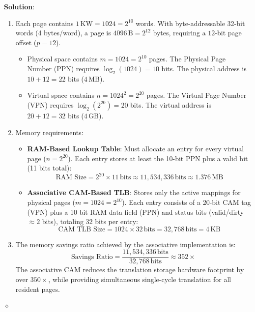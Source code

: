 \begin{problem}
\textbf{Solution}:
\begin{enumerate}
    \item Each page contains $1\,\text{KW} = 1024 = 2^{10}$ words. With byte-addressable 32-bit words (4 bytes/word), a page is $4096\,\text{B} = 2^{12}$ bytes, requiring a $12$-bit page offset ($p = 12$).
    \begin{itemize}
        \item Physical space contains $m = 1024 = 2^{10}$ pages. The Physical Page Number (PPN) requires $\log_2(1024) = 10$ bits. The physical address is $10 + 12 = 22$ bits ($4\,\text{MB}$).
        \item Virtual space contains $n = 1024^2 = 2^{20}$ pages. The Virtual Page Number (VPN) requires $\log_2(2^{20}) = 20$ bits. The virtual address is $20 + 12 = 32$ bits ($4\,\text{GB}$).
    \end{itemize}
    \item Memory requirements:
    \begin{itemize}
        \item \textbf{RAM-Based Lookup Table}: Must allocate an entry for every virtual page ($n = 2^{20}$). Each entry stores at least the 10-bit PPN plus a valid bit (11 bits total):
        \[
        \text{RAM Size} = 2^{20} \times 11\,\text{bits} \approx 11{,}534{,}336\,\text{bits} \approx 1.376\,\text{MB}
        \]
        \item \textbf{Associative CAM-Based TLB}: Stores only the active mappings for physical pages ($m = 1024 = 2^{10}$). Each entry consists of a 20-bit CAM tag (VPN) plus a 10-bit RAM data field (PPN) and status bits (valid/dirty $\approx 2$ bits), totaling 32 bits per entry:
        \[
        \text{CAM TLB Size} = 1024 \times 32\,\text{bits} = 32{,}768\,\text{bits} = 4\,\text{KB}
        \]
    \end{itemize}
    \item The memory savings ratio achieved by the associative implementation is:
    \[
    \text{Savings Ratio} = \frac{11{,}534{,}336\,\text{bits}}{32{,}768\,\text{bits}} \approx 352\times
    \]
    The associative CAM reduces the translation storage hardware footprint by over $350\times$, while providing simultaneous single-cycle translation for all resident pages.
\end{enumerate}
$\diamond$
\end{problem}


